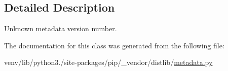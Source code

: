 \subsection{Detailed Description}
\begin{DoxyVerb}Unknown metadata version number.\end{DoxyVerb}
 

The documentation for this class was generated from the following file\+:\begin{DoxyCompactItemize}
\item 
venv/lib/python3./site-\/packages/pip/\+\_\+vendor/distlib/\hyperlink{pip_2__vendor_2distlib_2metadata_8py}{metadata.\+py}\end{DoxyCompactItemize}
